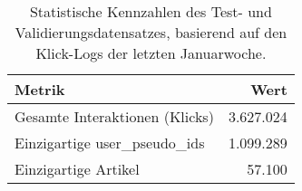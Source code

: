 
\begin{table}[htbp]
    \centering
    \caption{Statistische Kennzahlen des Test- und Validierungsdatensatzes, basierend auf den Klick-Logs der letzten Januarwoche.}
    \label{tab:statistiken_test}
    \begin{tabular}{lr}
        \toprule
        \textbf{Metrik} & \textbf{Wert} \\
        \midrule
        Gesamte Interaktionen (Klicks) & 3.627.024 \\
        Einzigartige user\_pseudo\_ids & 1.099.289 \\
        Einzigartige Artikel & 57.100 \\
        \bottomrule
    \end{tabular}
\end{table}
